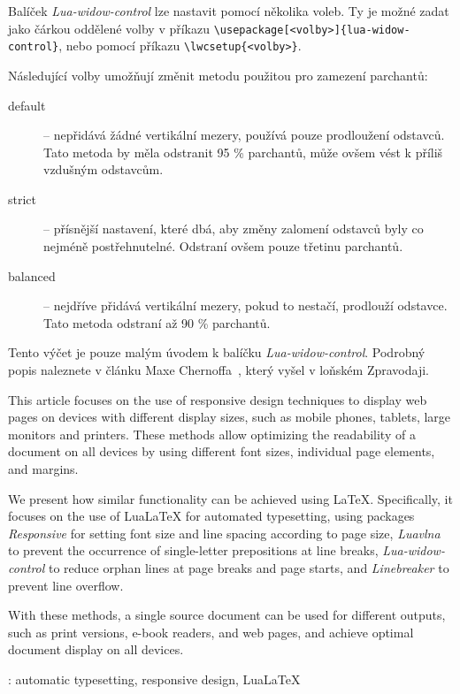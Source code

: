 \documentclass{csbulletin}
\newcommand\balicek[1]{\textit{#1}}
\begin{document}
Balíček \balicek{Lua-widow-control} lze nastavit pomocí několika voleb. Ty je možné zadat jako čárkou oddělené volby 
v příkazu  \verb|\usepackage[<volby>]{lua-widow-control}|, nebo pomocí příkazu 
\verb|\lwcsetup{<volby>}|.

Následující volby umožňují změnit metodu použitou pro zamezení parchantů:

 \begin{description}
   \item[default] – nepřidává žádné vertikální mezery, používá pouze prodloužení odstavců. Tato metoda by měla odstranit 95 \% parchantů, může ovšem vést k příliš vzdušným odstavcům.
   \item[strict] – přísnější nastavení, které dbá, aby změny zalomení odstavců byly co nejméně postřehnutelné.  Odstraní ovšem pouze třetinu parchantů.
   \item[balanced] – nejdříve přidává vertikální mezery, pokud to nestačí, prodlouží odstavce. Tato metoda odstraní až 90 \% parchantů.
  \end{description}

Tento výčet je pouze malým úvodem k balíčku \balicek{Lua-widow-control}. Podrobný popis naleznete v článku Maxe Chernoffa~\cite{chernoff}, který vyšel v loňském Zpravodaji.



\printbibliography

\begin{summary}
  This article focuses on the use of responsive design techniques to display
  web pages on devices with different display sizes, such as mobile phones,
  tablets, large monitors and printers. These methods allow optimizing the
  readability of a document on all devices by using different font sizes,
  individual page elements, and margins.

  We present how similar functionality can be achieved using \LaTeX.
  Specifically, it focuses on the use of Lua\LaTeX{} for automated typesetting,
  using packages \balicek{Responsive} for setting font size and line spacing according to page size,
  \balicek{Luavlna} to prevent the occurrence of
  single-letter prepositions at line breaks, \balicek{Lua-widow-control} to
  reduce orphan lines at page breaks and page starts, and \balicek{Linebreaker}
  to prevent line overflow.

  With these methods, a single source document can be used for different
  outputs, such as print versions, e-book readers, and web pages, and achieve
  optimal document display on all devices.

\keywords: automatic typesetting, responsive design, Lua\LaTeX
\end{summary}
\end{document}
